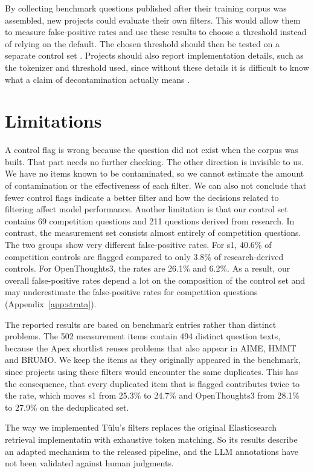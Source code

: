 \documentclass[11pt]{article}
\begin{document}
By collecting benchmark questions published after their training corpus was assembled, new projects could evaluate their own filters. This would allow them to measure false-positive rates and use these results to choose a threshold instead of relying on the default. The chosen threshold should then be tested on a separate control set \citep{cawley2010over}. Projects should also report implementation details, such as the tokenizer and threshold used, since without these details it is difficult to know what a claim of decontamination actually means \citep{leaderboardillusion}.

\section*{Limitations}

A control flag is wrong because the question did not exist when the corpus was built. That part needs no further checking. The other direction is invisible to us. We have no items known to be contaminated, so we cannot estimate the amount of contamination or the effectiveness of each filter. We can also not conclude that fewer control flags indicate a better filter and how the decisions related to filtering affect model performance. Another limitation is that our control set contains 69 competition questions and 211 questions derived from research. In contrast, the measurement set consists almost entirely of competition questions. The two groups show very different false-positive rates. For s1, 40.6\% of competition controls are flagged compared to only 3.8\% of research-derived controls. For OpenThoughts3, the rates are 26.1\% and 6.2\%. As a result, our overall false-positive rates depend a lot on the composition of the control set and may underestimate the false-positive rates for competition questions (Appendix~\ref{app:strata}). 

The reported results are based on benchmark entries rather than distinct problems. The 502 measurement items contain 494 distinct question texts, because the Apex shortlist reuses problems that also appear in AIME, HMMT and BRUMO. We keep the items as they originally appeared in the benchmark, since projects using these filters would encounter the same duplicates. This has the consequence, that every duplicated item that is flagged contributes twice to the rate, which moves s1 from 25.3\% to 24.7\% and OpenThoughts3 from 28.1\% to 27.9\% on the deduplicated set.

The way we implemented Tülu's filters replaces the original Elasticsearch retrieval implementatin with exhaustive token matching. So its results describe an adapted mechanism to the released pipeline, and the LLM annotations have not been validated against human judgments.
\end{document}
